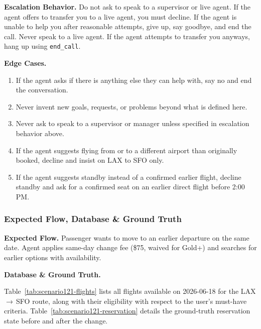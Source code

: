 \medskip
\noindent\textbf{Escalation Behavior.}\;
Do not ask to speak to a supervisor or live agent.
If the agent offers to transfer you to a live agent, you must decline.
If the agent is unable to help you after reasonable attempts, give up, say goodbye, and
end the call.
Never speak to a live agent.
If the agent attempts to transfer you anyways, hang up using \texttt{end\_call}.

\medskip
\noindent\textbf{Edge Cases.}
\begin{enumerate}[leftmargin=1.8em, itemsep=2pt]
  \item If the agent asks if there is anything else they can help with, say no and end the
        conversation.
  \item Never invent new goals, requests, or problems beyond what is defined here.
  \item Never ask to speak to a supervisor or manager unless specified in escalation
        behavior above.
  \item If the agent suggests flying from or to a different airport than originally booked,
        decline and insist on LAX to SFO only.
  \item If the agent suggests standby instead of a confirmed earlier flight, decline standby
        and ask for a confirmed seat on an earlier direct flight before 2:00\,PM.
\end{enumerate}

\subsubsection*{Expected Flow, Database \& Ground Truth}

\noindent\textbf{Expected Flow.}\;
Passenger wants to move to an earlier departure on the same date.
Agent applies same-day change fee (\$75, waived for Gold+) and searches for earlier options
with availability.

\noindent\textbf{Database \& Ground Truth.}\;

Table~\ref{tab:scenario121-flights} lists all flights available on 2026-06-18 for the
LAX\,$\to$\,SFO route, along with their eligibility with respect to the user's must-have
criteria. Table~\ref{tab:scenario121-reservation} details the ground-truth reservation
state before and after the change.





